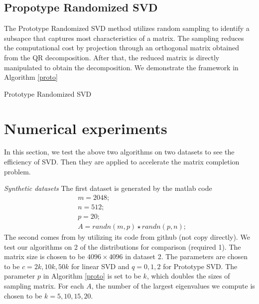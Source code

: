 \documentclass{article}
\begin{document}
\subsection{Propotype Randomized SVD}
The Prototype Randomized SVD method utilizes random sampling to identify a subsapce that captures most characteristics of a matrix. The sampling reduces the computational cost by projection through an orthogonal matrix obtained from the QR decomposition. After that, the reduced matrix is directly manipulated to obtain the decomposition. We demonstrate the framework in Algorithm \ref{proto}
\begin{algorithm}[p]
    \caption{Prototype Randomized SVD}
    \begin{algorithmic}[1]\label{proto}
    \end{algorithmic}
\end{algorithm}
\section{Numerical experiments}
In this section, we test the above two algorithms on two datasets to see the efficiency of SVD. Then they are applied to accelerate the matrix completion problem.

\emph{Synthetic datasets} The first dataset is generated by the matlab code 
$$
\begin{aligned}
&m=2048 ; \\
&n=512 ; \\
&p=20 ; \\
&A=r a n d n(m, p) \star r a n d n(p, n) ;
\end{aligned}
$$
The second comes from \cite{halko2011finding} by utilizing its code from github (not copy directly). We test our algorithms on 2 of the distributions for comparison (required 1). The matrix size is chosen to be $4096\times 4096$ in dataset 2. The parameters are chosen to be $c=2k,10k,50k$ for linear SVD and $q=0,1,2$ for Prototype SVD. The parameter $p$ in Algorithm \ref{proto} is set to be $k$, which doubles the sizes of sampling matrix. For each $A$, the number of the largest eigenvalues we compute is chosen to be $k=5,10,15,20$.
\end{document}
